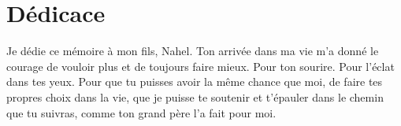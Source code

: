 \chapter*{Dédicace}
Je dédie ce mémoire à mon fils, Nahel. Ton arrivée dans ma vie m'a donné le courage de vouloir plus et de toujours faire mieux. Pour ton sourire. Pour l'éclat dans tes yeux. Pour que tu puisses avoir la même chance que moi, de faire tes propres choix dans la vie, que je puisse te soutenir et t'épauler dans le chemin que tu suivras, comme ton grand père l'a fait pour moi.